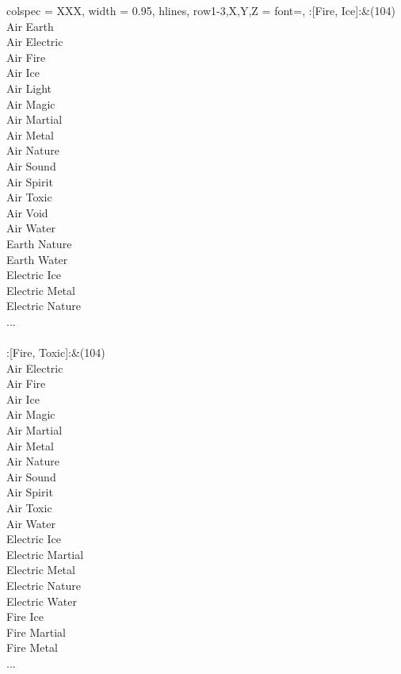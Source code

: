 \begin{longtblr}[
	caption = {2v2 Defending Weak},
	label = {2v2-Defending-Weak},
]{
	colspec = {XXX}, width = 0.95\linewidth,
	hlines,
	row{1-3,X,Y,Z} = {font=\bfseries},
}
	:[Fire, Ice]:&{(104)\\
	Air Earth \\
	Air Electric \\
	Air Fire \\
	Air Ice \\
	Air Light \\
	Air Magic \\
	Air Martial \\
	Air Metal \\
	Air Nature \\
	Air Sound \\
	Air Spirit \\
	Air Toxic \\
	Air Void \\
	Air Water \\
	Earth Nature \\
	Earth Water \\
	Electric Ice \\
	Electric Metal \\
	Electric Nature \\
	...\\
	}\\

	:[Fire, Toxic]:&{(104)\\
	Air Electric \\
	Air Fire \\
	Air Ice \\
	Air Magic \\
	Air Martial \\
	Air Metal \\
	Air Nature \\
	Air Sound \\
	Air Spirit \\
	Air Toxic \\
	Air Water \\
	Electric Ice \\
	Electric Martial \\
	Electric Metal \\
	Electric Nature \\
	Electric Water \\
	Fire Ice \\
	Fire Martial \\
	Fire Metal \\
	...\\
	}\\


\end{longtblr}
